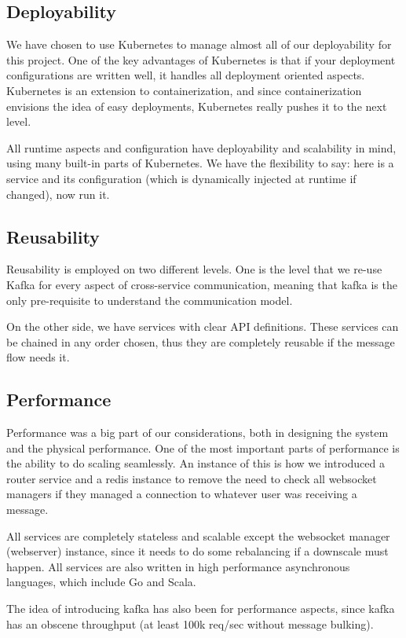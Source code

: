 \subsection{Deployability}
We have chosen to use Kubernetes to manage almost all of our deployability for this project.
One of the key advantages of Kubernetes is that if your deployment configurations are written well, it handles all deployment oriented aspects.
Kubernetes is an extension to containerization, and since containerization envisions the idea of easy deployments, Kubernetes really pushes it to the next level.

All runtime aspects and configuration have deployability and scalability in mind, using many built-in parts of Kubernetes.
We have the flexibility to say: here is a service and its configuration (which is dynamically injected at runtime if changed), now run it.

\subsection{Reusability}
Reusability is employed on two different levels.
One is the level that we re-use Kafka for every aspect of cross-service communication, meaning that kafka is the only pre-requisite to understand the communication model.

On the other side, we have services with clear API definitions.
These services can be chained in any order chosen, thus they are completely reusable if the message flow needs it.
\subsection{Performance}
Performance was a big part of our considerations, both in designing the system and the physical performance.
One of the most important parts of performance is the ability to do scaling seamlessly.
An instance of this is how we introduced a router service and a redis instance to remove the need to check all websocket managers if they managed a connection to whatever user was receiving a message.

All services are completely stateless and scalable except the websocket manager (webserver) instance, since it needs to do some rebalancing if a downscale must happen.
All services are also written in high performance asynchronous languages, which include Go and Scala.

The idea of introducing kafka has also been for performance aspects, since kafka has an obscene throughput (at least 100k req/sec without message bulking).
